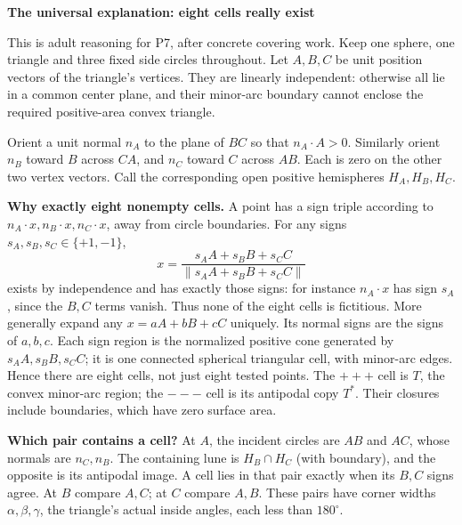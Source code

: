\documentclass[11pt,letterpaper]{article}
\newcommand{\topic}[1]{\par{\large\bfseries\color{blue}#1}\par}
\newcommand{\degc}{^\circ}
\begin{document}
\newpage
\topic{The universal explanation: eight cells really exist}
This is adult reasoning for P7, after concrete covering work. Keep one sphere, one triangle and three fixed side circles throughout. Let $A,B,C$ be unit position vectors of the triangle's vertices. They are linearly independent: otherwise all lie in a common center plane, and their minor-arc boundary cannot enclose the required positive-area convex triangle.

Orient a unit normal $n_A$ to the plane of $BC$ so that $n_A\cdot A>0$. Similarly orient $n_B$ toward $B$ across $CA$, and $n_C$ toward $C$ across $AB$. Each is zero on the other two vertex vectors. Call the corresponding open positive hemispheres $H_A,H_B,H_C$.

\textbf{Why exactly eight nonempty cells.} A point has a sign triple according to $n_A\cdot x,n_B\cdot x,n_C\cdot x$, away from circle boundaries. For any signs $s_A,s_B,s_C\in\{+1,-1\}$,
\[
 x=\frac{s_AA+s_BB+s_CC}{\lVert s_AA+s_BB+s_CC\rVert}
\]
exists by independence and has exactly those signs: for instance $n_A\cdot x$ has sign $s_A$, since the $B,C$ terms vanish. Thus none of the eight cells is fictitious. More generally expand any $x=aA+bB+cC$ uniquely. Its normal signs are the signs of $a,b,c$. Each sign region is the normalized positive cone generated by $s_AA,s_BB,s_CC$; it is one connected spherical triangular cell, with minor-arc edges. Hence there are eight cells, not just eight tested points. The $+++$ cell is $T$, the convex minor-arc region; the $---$ cell is its antipodal copy $T^*$. Their closures include boundaries, which have zero surface area.

\textbf{Which pair contains a cell?} At $A$, the incident circles are $AB$ and $AC$, whose normals are $n_C,n_B$. The containing lune is $H_B\cap H_C$ (with boundary), and the opposite is its antipodal image. A cell lies in that pair exactly when its $B,C$ signs agree. At $B$ compare $A,C$; at $C$ compare $A,B$. These pairs have corner widths $\alpha,\beta,\gamma$, the triangle's actual inside angles, each less than $180\degc$.
\end{document}
